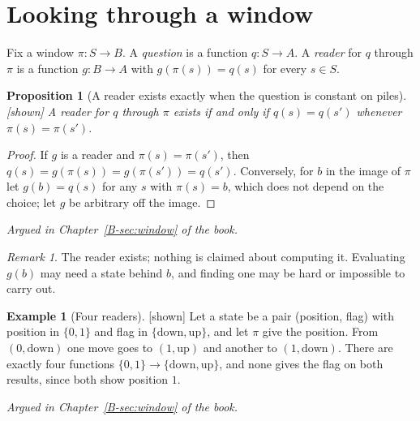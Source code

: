 \documentclass[11pt, a4paper]{article}
\theoremstyle{plain}
\newtheorem{proposition}[theorem]{Proposition}
\theoremstyle{definition}
\newtheorem{example}[theorem]{Example}
\theoremstyle{remark}
\newtheorem{remark}[theorem]{Remark}
\newcommand{\argued}[1]{\par\noindent\textit{Argued in Chapter~\ref{B-#1} of the book.}\par}
\newcommand{\kind}[1]{\textup{[#1]}}
\begin{document}
\section{Looking through a window}\label{spec:ch07}

Fix a window $\pi:S\to B$. A \emph{question} is a function $q:S\to A$. A \emph{reader} for $q$ through $\pi$
is a function $g:B\to A$ with $g(\pi(s))=q(s)$ for every $s\in S$.

\begin{proposition}[A reader exists exactly when the question is constant on piles]\label{spec:reader}
\kind{shown}
A reader for $q$ through $\pi$ exists if and only if $q(s)=q(s')$ whenever $\pi(s)=\pi(s')$.
\end{proposition}
\begin{proof}
If $g$ is a reader and $\pi(s)=\pi(s')$, then $q(s)=g(\pi(s))=g(\pi(s'))=q(s')$. Conversely, for $b$ in the
image of $\pi$ let $g(b)=q(s)$ for any $s$ with $\pi(s)=b$, which does not depend on the choice; let $g$ be
arbitrary off the image.
\end{proof}
\argued{sec:window}

\begin{remark}
The reader exists; nothing is claimed about computing it. Evaluating $g(b)$ may need a state behind $b$,
and finding one may be hard or impossible to carry out.
\end{remark}

\begin{example}[Four readers]\label{spec:four-readers} \kind{shown}
Let a state be a pair (position, flag) with position in $\{0,1\}$ and flag in $\{\mathrm{down},\mathrm{up}\}$,
and let $\pi$ give the position. From $(0,\mathrm{down})$ one move goes to $(1,\mathrm{up})$ and another to
$(1,\mathrm{down})$. There are exactly four functions $\{0,1\}\to\{\mathrm{down},\mathrm{up}\}$, and none
gives the flag on both results, since both show position $1$.
\end{example}
\argued{sec:window}
\end{document}

